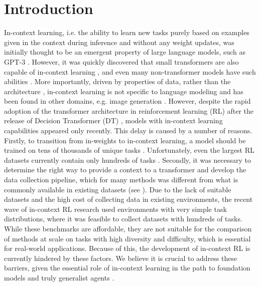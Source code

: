 \documentclass{article}
\begin{document}
\section{Introduction}
In-context learning, i.e. the ability to learn new tasks purely based on examples given in the context during inference and without any weight updates, was initially thought to be an emergent property of large language models, such as GPT-3 \citep{brown2020language}. However, it was quickly discovered that small transformers are also capable of in-context learning \citep{kirsch2022general, von2023transformers}, and even many non-transformer models have such abilities \citep{bhattamishra2023understanding, akyurek2024context, park2024can, grazzi2024mamba, vladymyrov2024linear, tong2024mlps}. More importantly, driven by properties of data, rather than the architecture \citep{chan2022data, gu2023pre}, in-context learning is not specific to language modeling and has been found in other domains, e.g. image generation \citep{bai2023sequential, najdenkoska2023context, doveh2024towards, tian2024visual}.
However, despite the rapid adoption of the transformer architecture in reinforcement learning (RL) after the release of Decision Transformer (DT) \citep{chen2021decision, hu2022transforming, agarwal2023transformers, li2023survey}, models with in-context learning capabilities appeared only recently. This delay is caused by a number of reasons. Firstly, to transition from in-weights to in-context learning, a model should be trained on tens of thousands of unique tasks \citep{kirsch2022general}. Unfortunately, even the largest RL datasets currently contain only hundreds of tasks \citep{padalkar2023open}. Secondly, it was necessary to determine the right way to provide a context to a transformer and develop the data collection pipeline, which for many methods \citep{laskin2022context, lee2023supervised, shi2024cross} was different from what is commonly available in existing datasets (see ).
Due to the lack of suitable datasets and the high cost of collecting data in existing environments, the recent wave of in-context RL research \citep{laskin2022context, lee2023supervised, norman2023first, kirsch2023towards, sinii2023context, zisman2023emergence} used environments with very simple task distributions, where it was feasible to collect datasets with hundreds of tasks. While these benchmarks are affordable, they are not suitable for the comparison of methods at scale on tasks with high diversity and difficulty, which is essential for real-world applications. Because of this, the development of in-context RL is currently hindered by these factors. We believe it is crucial to address these barriers, given the essential role of in-context learning in the path to foundation models and truly generalist agents \citep{team2021open, team2023human, kirsch2023towards, lu2024structured, liu2024position}.
\end{document}
